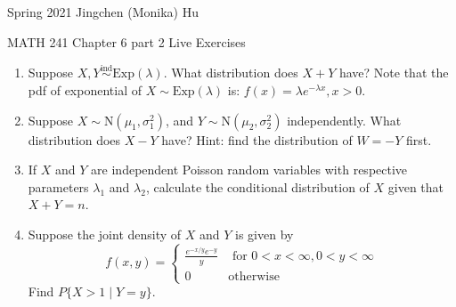 \documentclass[11pt]{article}
\begin{document}
\enlargethispage{\baselineskip}

Spring 2021 \hfill Jingchen (Monika) Hu\\

\begin{center}
{\huge MATH 241 Chapter 6 part 2 Live Exercises}	\\
\end{center}
\vspace{0.5cm}

\begin{enumerate}


\item Suppose $X, Y \stackrel{\text{ind}}{\sim} \text{Exp}(\lambda)$. What distribution does $X+Y$ have? Note that the pdf of exponential of $X \sim \text{Exp}(\lambda)$ is: $f(x) = \lambda e^{-\lambda x}, x > 0$.

\item Suppose $X \sim \text{N}(\mu_1, \sigma^2_1)$, and $Y \sim \text{N}(\mu_2, \sigma^2_2)$ independently. What distribution does $X-Y$ have? Hint: find the distribution of $W = -Y$ first. 

\item If $X$ and $Y$ are independent Poisson random variables with respective parameters $\lambda_1$ and $\lambda_2$, calculate the conditional distribution of $X$ given that $X + Y = n$.

\item Suppose the joint density of $X$ and $Y$ is given by
\[ f(x,y) = \begin{cases}
    \frac{e^{-x/y}e^{-y}}{y} 		 & \text{ for } 0 < x < \infty, 0 < y < \infty \\
    0         & \text{otherwise}
\end{cases}
 \]
Find $P\{X > 1 \mid Y = y\}$.

\end{enumerate}
\end{document}
